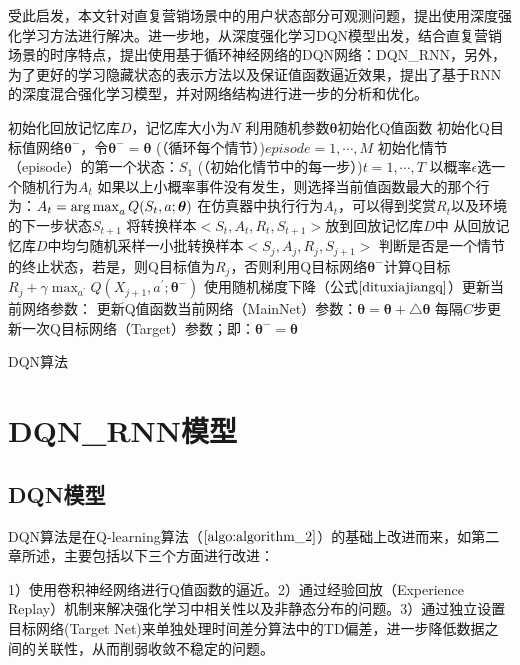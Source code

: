 受此启发，本文针对直复营销场景中的用户状态部分可观测问题，提出使用深度强化学习方法进行解决。进一步地，从深度强化学习DQN模型出发，结合直复营销场景的时序特点，提出使用基于循环神经网络的DQN网络：DQN_RNN，另外，为了更好的学习隐藏状态的表示方法以及保证值函数逼近效果，提出了基于RNN的深度混合强化学习模型，并对网络结构进行进一步的分析和优化。

\begin{algorithm}[htbp]
 \small
 \SetAlgoLined
 初始化回放记忆库$D$，记忆库大小为$N$\;
 利用随机参数$\bm{\theta}$初始化Q值函数\;
 初始化Q目标值网络$\bm{\theta}^{-}$，令$\bm{\theta}^{-}=\bm{\theta}$\;
 \For(（循环每个情节）){$episode=1,\cdots, M$}{
	初始化情节（episode）的第一个状态：$S_{1}$\;
	\For(（初始化情节中的每一步）){$t=1,\cdots, T$}{
		以概率$\epsilon$选一个随机行为$A_{t}$\;
		如果以上小概率事件没有发生，则选择当前值函数最大的那个行为：$A_{t}=\operatorname*{arg\,max}_{a}Q(S_{t},a;\bm{\theta})$\;
		在仿真器中执行行为$A_{t}$，可以得到奖赏$R_{t}$以及环境的下一步状态$S_{t+1}$\;
		将转换样本$<S_{t}, A_{t}, R_{t}, S_{t+1}>$放到回放记忆库$D$中\;
		从回放记忆库$D$中均匀随机采样一小批转换样本$<S_{j}, A_{j}, R_{j}, S_{j+1}>$\;
		判断是否是一个情节的终止状态，若是，则Q目标值为$R_{j}$，否则利用Q目标网络$\bm{\theta}^{-}$计算Q目标$R_{j}+\gamma \max_{a^{'}}Q(X_{j+1},a^{'};\bm{\theta}^{-})$\;
		使用随机梯度下降（公式$\eqref{dituxiajiangq}$）更新当前网络参数：
		更新Q值函数当前网络（MainNet）参数：$\bm{\theta}=\bm{\theta}+\triangle \bm{\theta}$\;
		每隔$C$步更新一次Q目标网络（Target）参数；即：$\bm{\theta}^{-}=\bm{\theta}$\;
	}
 }
 \caption{DQN算法}
 \label{algo:algorithm_DQN}
 \end{algorithm}


\section{DQN_RNN模型}

\subsection{DQN模型}
 DQN算法是在Q-learning算法（$\ref{algo:algorithm_2}$）的基础上改进而来，如第二章所述，主要包括以下三个方面进行改进：

 1）使用卷积神经网络进行Q值函数的逼近。2）通过经验回放（Experience Replay）机制来解决强化学习中相关性以及非静态分布的问题。3）通过独立设置目标网络(Target Net)来单独处理时间差分算法中的TD偏差，进一步降低数据之间的关联性，从而削弱收敛不稳定的问题。


